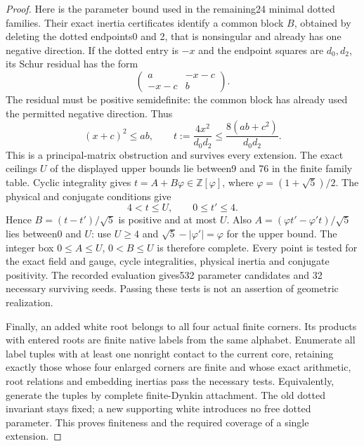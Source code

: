 \documentclass[11pt]{article}
\begin{document}
\begin{proof}
Here is the parameter bound used in the remaining24 minimal dotted
families. Their exact inertia certificates identify a common block
$B$, obtained by deleting the dotted endpoints0 and 2, that is
nonsingular and already has one negative direction. If the dotted
entry is $-x$ and the endpoint squares are $d_0,d_2$, its Schur
residual has the form
\[
 \begin{pmatrix}a&-x-c\\-x-c&b\end{pmatrix}.
\]
The residual must be positive semidefinite: the common block has
already used the permitted negative direction. Thus
\[
 (x+c)^2\le ab,\qquad
 t:=\frac{4x^2}{d_0d_2}\le\frac{8(ab+c^2)}{d_0d_2}.
\]
This is a principal-matrix obstruction and survives every extension.
The exact ceilings $U$ of the displayed upper bounds lie between9
and 76 in the finite family table. Cyclic integrality gives
$t=A+B\varphi\in\mathbb Z[\varphi]$, where
$\varphi=(1+\sqrt5)/2$. The physical and conjugate conditions give
\[
 4<t\le U,\qquad 0\le t'\le4.
\]
Hence $B=(t-t')/\sqrt5$ is positive and at most $U$. Also
$A=(\varphi t'-\varphi't)/\sqrt5$ lies between0 and $U$:
use $U\ge4$ and $\sqrt5-|\varphi'|=\varphi$ for the upper
bound. The integer box $0\le A\le U$, $0<B\le U$ is therefore
complete. Every point is tested for the exact field and gauge,
cycle integralities, physical inertia and conjugate positivity.
The recorded evaluation gives532 parameter candidates and 32
necessary surviving seeds. Passing these tests is not an assertion
of geometric realization.

Finally, an added white root belongs to all four actual finite
corners. Its products with entered roots are finite native labels
from the same alphabet. Enumerate all label tuples with at least
one nonright contact to the current core, retaining exactly those
whose four enlarged corners are finite and whose exact arithmetic,
root relations and embedding inertias pass the necessary tests.
Equivalently, generate the tuples by complete finite-Dynkin
attachment. The old dotted invariant stays fixed; a new supporting
white introduces no free dotted parameter. This proves finiteness
and the required coverage of a single extension.
\end{proof}
\end{document}
